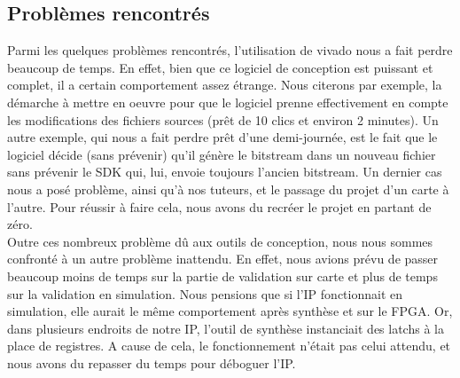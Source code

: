 \subsection{Problèmes rencontrés}

Parmi les quelques problèmes rencontrés, l'utilisation de vivado nous a fait perdre beaucoup de temps. 
En effet, bien que ce logiciel de conception est puissant et complet, il a certain comportement assez étrange. 
Nous citerons par exemple, la démarche à mettre en oeuvre pour que le logiciel prenne 
effectivement en compte les modifications des fichiers sources (prêt de 10 clics et environ 2 minutes). 
Un autre exemple, qui nous a fait perdre prêt d'une demi-journée, est le fait que le logiciel décide (sans prévenir) 
qu'il génère le bitstream dans un nouveau fichier sans prévenir le SDK qui, lui, envoie toujours l'ancien bitstream. 
Un dernier cas nous a posé problème, ainsi qu'à nos tuteurs, et le passage du projet d'un carte à l'autre. 
Pour réussir à faire cela, nous avons du recréer le projet en partant de zéro.\\

Outre ces nombreux problème dû aux outils de conception, nous nous sommes confronté à un autre problème inattendu. 
En effet, nous avions prévu de passer beaucoup moins de temps sur la partie de validation sur 
carte et plus de temps sur la validation en simulation. Nous pensions que si l'IP fonctionnait en simulation, 
elle aurait le même comportement après synthèse et sur le FPGA. 
Or, dans plusieurs endroits de notre IP, l'outil de synthèse instanciait des latchs à la place de registres. 
A cause de cela, le fonctionnement n'était pas celui attendu, et nous avons du repasser du temps pour déboguer l'IP.












